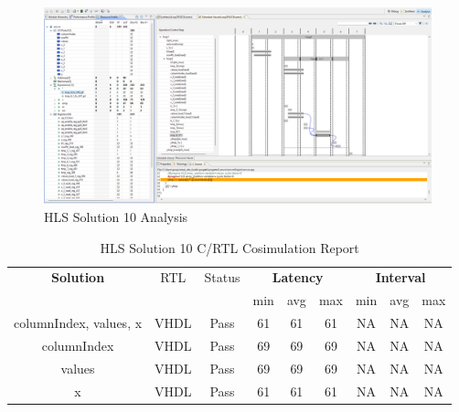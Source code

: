 \begin{figure}[H]
	\centering
	\includegraphics[width=1\textwidth]{solutions/s10/s10analysis.png}
	\caption{HLS Solution 10 Analysis}
\end{figure}

\begin{table}[H]
	\centering
	\begin{tabular}{|c|c|c|c|c|c|c|c|c|}
		\hline
		\multicolumn{1}{|c|}{\textbf{Solution}} & \multicolumn{1}{|c|}{RTL} & \multicolumn{1}{|c|}{Status} & \multicolumn{3}{c|}{\textbf{Latency}} & \multicolumn{3}{c|}{\textbf{Interval}} \\
		& &  & min & avg & max & min & avg & max \\
		\hline
		columnIndex, values, x & VHDL & Pass & 61 & 61 & 61 & NA & NA & NA \\
		\hline
		columnIndex & VHDL & Pass & 69 & 69 & 69 & NA & NA & NA \\
		\hline
		values & VHDL & Pass & 69 & 69 & 69 & NA & NA & NA \\
		\hline
		x & VHDL & Pass & 61 & 61 & 61 & NA & NA & NA \\
		\hline
	\end{tabular}
	\caption{HLS Solution 10 C/RTL Cosimulation Report }
	\label{tab:hls-solution-10-cosimulation-report}
\end{table}

